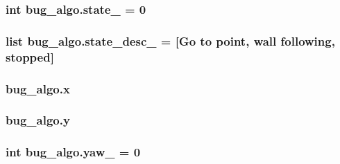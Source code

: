 \subsubsection[{\texorpdfstring{state\+\_\+}{state_}}]{\setlength{\rightskip}{0pt plus 5cm}int bug\+\_\+algo.\+state\+\_\+ = 0}\hypertarget{namespacebug__algo_a5bf52a66b7821a097f6e653a2422748e}{}\label{namespacebug__algo_a5bf52a66b7821a097f6e653a2422748e}
\subsubsection[{\texorpdfstring{state\+\_\+desc\+\_\+}{state_desc_}}]{\setlength{\rightskip}{0pt plus 5cm}list bug\+\_\+algo.\+state\+\_\+desc\+\_\+ = \mbox{[}\textquotesingle{}Go to point\textquotesingle{}, \textquotesingle{}wall following\textquotesingle{}, \textquotesingle{}stopped\textquotesingle{}\mbox{]}}\hypertarget{namespacebug__algo_a419cb7998b9a3946692fc01f5d73a25b}{}\label{namespacebug__algo_a419cb7998b9a3946692fc01f5d73a25b}
\subsubsection[{\texorpdfstring{x}{x}}]{\setlength{\rightskip}{0pt plus 5cm}bug\+\_\+algo.\+x}\hypertarget{namespacebug__algo_ae006850add8691db5d752b4ccb732ac1}{}\label{namespacebug__algo_ae006850add8691db5d752b4ccb732ac1}
\subsubsection[{\texorpdfstring{y}{y}}]{\setlength{\rightskip}{0pt plus 5cm}bug\+\_\+algo.\+y}\hypertarget{namespacebug__algo_a1e2d049a4b898c92454f0fb146a413ee}{}\label{namespacebug__algo_a1e2d049a4b898c92454f0fb146a413ee}
\subsubsection[{\texorpdfstring{yaw\+\_\+}{yaw_}}]{\setlength{\rightskip}{0pt plus 5cm}int bug\+\_\+algo.\+yaw\+\_\+ = 0}\hypertarget{namespacebug__algo_a2c8d86dd369e86415dc7ff9c617033d7}{}\label{namespacebug__algo_a2c8d86dd369e86415dc7ff9c617033d7}
